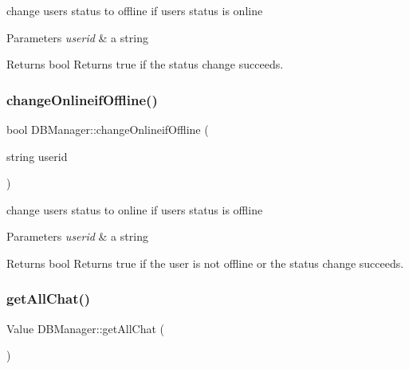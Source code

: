 change user\textquotesingle{}s status to offline if user\textquotesingle{}s status is online 


\begin{DoxyParams}{Parameters}
{\em userid} & a string \\
\hline
\end{DoxyParams}
\begin{DoxyReturn}{Returns}
bool Returns true if the status change succeeds. 
\end{DoxyReturn}
\mbox{\label{class_d_b_manager_a51bb4bba0e60fecca52f93c93063fa90}} 
\subsubsection{\texorpdfstring{change\+Onlineif\+Offline()}{changeOnlineifOffline()}}
{\footnotesize\ttfamily bool D\+B\+Manager\+::change\+Onlineif\+Offline (\begin{DoxyParamCaption}\item[{string}]{userid }\end{DoxyParamCaption})}



change user\textquotesingle{}s status to online if user\textquotesingle{}s status is offline 


\begin{DoxyParams}{Parameters}
{\em userid} & a string \\
\hline
\end{DoxyParams}
\begin{DoxyReturn}{Returns}
bool Returns true if the user is not offline or the status change succeeds. 
\end{DoxyReturn}
\mbox{\label{class_d_b_manager_a546cf5b82fe9cb115cfee8d52f90f0da}} 
\subsubsection{\texorpdfstring{get\+All\+Chat()}{getAllChat()}}
{\footnotesize\ttfamily Value D\+B\+Manager\+::get\+All\+Chat (\begin{DoxyParamCaption}{ }\end{DoxyParamCaption})}



